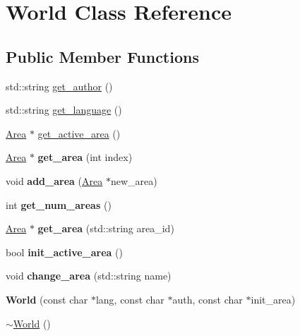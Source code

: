 \hypertarget{class_world}{
\section{\-World \-Class \-Reference}
\label{class_world}
}
\subsection*{\-Public \-Member \-Functions}
\begin{DoxyCompactItemize}
\item 
std\-::string \hyperlink{class_world_a13598968c1b4061eb1529cdcb0755372}{get\-\_\-author} ()
\item 
std\-::string \hyperlink{class_world_add6a887b9f085ec8d137b8f1f9e8de6c}{get\-\_\-language} ()
\item 
\hyperlink{class_area}{\-Area} $\ast$ \hyperlink{class_world_a8339c4c339f17bbea73ee0e9d32dc547}{get\-\_\-active\-\_\-area} ()
\item 
\hypertarget{class_world_ac7e22e2323d311975c288496ca755bff}{
\hyperlink{class_area}{\-Area} $\ast$ {\bfseries get\-\_\-area} (int index)}
\label{class_world_ac7e22e2323d311975c288496ca755bff}

\item 
\hypertarget{class_world_a64eb27a4ea7aaf9d36178e902676e8fe}{
void {\bfseries add\-\_\-area} (\hyperlink{class_area}{\-Area} $\ast$new\-\_\-area)}
\label{class_world_a64eb27a4ea7aaf9d36178e902676e8fe}

\item 
\hypertarget{class_world_a85cfec55f3135621a8a4a1f438f5cb93}{
int {\bfseries get\-\_\-num\-\_\-areas} ()}
\label{class_world_a85cfec55f3135621a8a4a1f438f5cb93}

\item 
\hypertarget{class_world_af31d16d13344c6f61b6aab34b34fab4b}{
\hyperlink{class_area}{\-Area} $\ast$ {\bfseries get\-\_\-area} (std\-::string area\-\_\-id)}
\label{class_world_af31d16d13344c6f61b6aab34b34fab4b}

\item 
\hypertarget{class_world_a8dadd0ff476194c1c6de68338d2012cf}{
bool {\bfseries init\-\_\-active\-\_\-area} ()}
\label{class_world_a8dadd0ff476194c1c6de68338d2012cf}

\item 
\hypertarget{class_world_a2a47dcf3eb1e54a2da3729018c34d53f}{
void {\bfseries change\-\_\-area} (std\-::string name)}
\label{class_world_a2a47dcf3eb1e54a2da3729018c34d53f}

\item 
\hypertarget{class_world_a5d24f8974db6e08f1938389ad8937c3e}{
{\bfseries \-World} (const char $\ast$lang, const char $\ast$auth, const char $\ast$init\-\_\-area)}
\label{class_world_a5d24f8974db6e08f1938389ad8937c3e}

\item 
\hyperlink{class_world_a8c73fba541a5817fff65147ba47cd827}{$\sim$\-World} ()
\end{DoxyCompactItemize}
